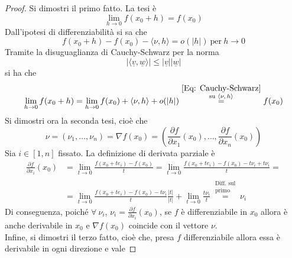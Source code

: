     \begin{proof}
        Si dimostri il primo fatto. La tesi è
        \begin{equation*}
            \lim_{h \to 0}{f(x_0+h)}=f(x_0)
        \end{equation*}
        Dall'ipotesi di differenziabilità si sa che
        \begin{equation*}
            f(x_0+h)-f(x_0)-\langle \nu, h \rangle = o(|h|)\ \text{per}\ h \to 0
        \end{equation*}
        Tramite la disuguaglianza di Cauchy-Schwarz per la norma
        \begin{equation} \label{Eq: Cauchy-Schwarz}
            | \langle \underline{v}, \underline{w} \rangle | \leq |\underline{v}||\underline{w}|
        \end{equation}
        si ha che 
        \begin{equation*}
            \lim_{h \to 0}{f(x_0+h)}= \lim_{h \to 0} {f(x_0)+ \langle \nu, h \rangle + o(|h|)}\overset{\substack{\eqref{Eq: Cauchy-Schwarz}\\ \text{su $\langle \nu, h \rangle$}}}{=} f(x_0)
        \end{equation*}
        Si dimostri ora la seconda tesi, cioè che 
        \begin{equation*}
            \nu=(\nu_1, \dots, \nu_n)= \nabla f(x_0) = \left(\frac{\partial{f}}{\partial{x_1}}{(x_0)}, \dots, \frac{\partial{f}}{\partial{x_n}}{(x_0)}\right)
        \end{equation*}
        Sia $i \in [1, n]$ fissato. La definizione di derivata parziale è
        \begin{equation*}
            \begin{aligned}
               \frac{\partial{f}}{\partial{x_i}}(x_0)&=\lim_{t \to 0}{\frac{f(x_0+te_i)-f(x_0)}{t}}=\lim_{t \to 0}{\frac{f(x_0+te_i)-f(x_0)-t\nu_i+t\nu_i}{t}}=\\
               &=\lim_{t \to 0}{\frac{f(x_0+te_i)-f(x_0)-t\nu_i}{t} \frac{|t|}{|t|}}+\lim_{t \to 0}{\frac{t\nu_i}{t}}\overset{\substack{\text{Diff. sul}\\\text{primo}}}{=} \nu_i
            \end{aligned}
        \end{equation*}
        Di conseguenza, poiché $\forall\ \nu_i$, $\nu_i=\frac{\partial{f}}{\partial{x_i}}(x_0)$, se $f$ è differenziabile in $x_0$ allora è anche derivabile in $x_0$ e $\nabla f(x_0)$ coincide con il vettore $\nu$.\\
        Infine, si dimostri il terzo fatto, cioè che, presa $f$ differenziabile allora essa è derivabile in ogni direzione e vale

\end{proof}
